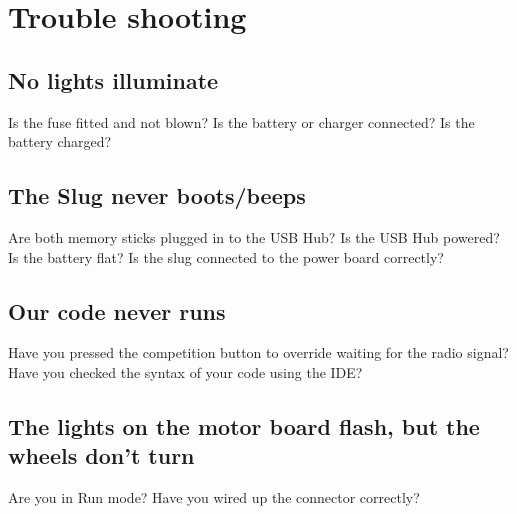 \documentclass[a4paper, 12pt]{article}
\begin{document}
\section{Trouble shooting}
\subsection{No lights illuminate}
Is the fuse fitted and not blown? Is the battery or charger connected? Is the battery charged?

\subsection{The Slug never boots/beeps}
Are both memory sticks plugged in to the USB Hub? Is the USB Hub powered? Is the battery flat? Is the slug connected to the power board correctly? 

\subsection{Our code never runs}
Have you pressed the competition button to override waiting for the radio signal? Have you checked the syntax of your code using the IDE?

\subsection{The lights on the motor board flash, but the wheels don't turn}
Are you in Run mode? Have you wired up the connector correctly?
\end{document}
